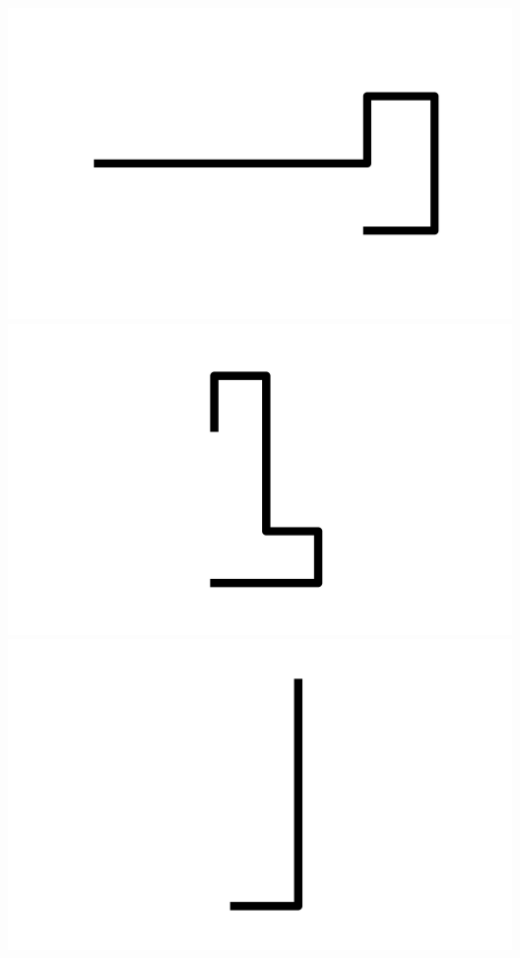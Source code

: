 \documentclass[]{report}
\begin{document}
\includegraphics[scale=.1]{pictures/21/state_cluster_shapes_268.pdf} 
\includegraphics[scale=.1]{pictures/21/state_cluster_shapes_269.pdf} 
\includegraphics[scale=.1]{pictures/21/state_cluster_shapes_270.pdf} 
\end{document}
